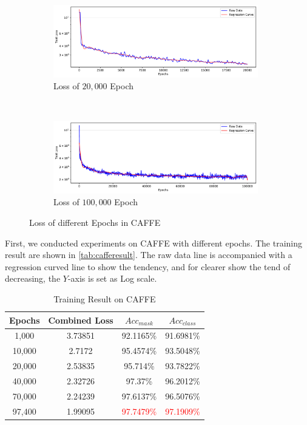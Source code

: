 \begin{spacing}{1.5}
\begin{figure}[ht]
    \centering
    \begin{subfigure}[b]{0.99\textwidth}
        \centering
        \includegraphics[width=0.98\textwidth, fbox]{Chapter5/testloss20000.pdf}
        \caption{Loss of $20,000$ Epoch}
    \end{subfigure}
    \\
    \begin{subfigure}[b]{0.99\textwidth}
        \centering
        \includegraphics[width=0.98\textwidth, fbox]{Chapter5/testloss100000.pdf}
        \caption{Loss of $100,000$ Epoch}
    \end{subfigure}
    \caption{Loss of different Epochs in CAFFE}
    \label{fig:testloss}
\end{figure}


First, we conducted experiments on CAFFE with different epochs. The training result are shown in \autoref{tab:cafferesult}. The raw data line is accompanied with a regression curved line to show the tendency, and for clearer show the tend of decreasing, the $Y$-axis is set as Log scale.

\begin{table}[ht]
\centering
\caption{Training Result on CAFFE}
\label{tab:cafferesult}
\begin{tabular}{@{}cccc@{}}
\toprule
\textbf{Epochs} & \textbf{Combined Loss} & \textbf{$Acc_{mask}$} & \textbf{$Acc_{class}$} \\ \midrule
1,000 & 3.73851 & 92.1165\% & 91.6981\% \\
10,000 & 2.7172 & 95.4574\% & 93.5048\% \\
20,000 & 2.53835 & 95.714\% & 93.7822\% \\
40,000 & 2.32726 & 97.37\% & 96.2012\% \\
70,000 & 2.24239 & 97.6137\% & 96.5076\% \\
97,400 & 1.99095 & \textcolor{red}{97.7479\%} & \textcolor{red}{97.1909\%} \\ \bottomrule
\end{tabular}
\end{table}


\end{spacing}

